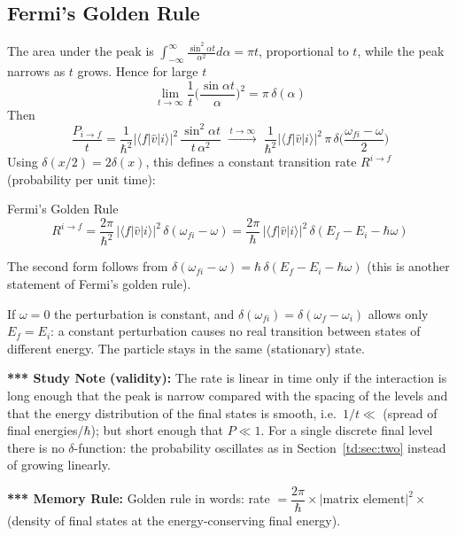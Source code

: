\documentclass[11pt,a4paper]{article}
\begin{document}
\subsection{Fermi's Golden Rule}
The area under the peak is $\int_{-\infty}^\infty\frac{\sin^2\alpha t}{\alpha^2}d\alpha=\pi t$, proportional to $t$, while the peak narrows as $t$ grows. Hence for large $t$
\[
\lim_{t\to\infty}\frac1t\Big(\frac{\sin\alpha t}{\alpha}\Big)^2=\pi\,\delta(\alpha)
\]
Then
\[
\frac{P_{i\to f}}{t}=\frac1{\hbar^2}|\langle f|\hat v|i\rangle|^2\,\frac{\sin^2\alpha t}{t\,\alpha^2}
\;\xrightarrow{\,t\to\infty\,}\;\frac1{\hbar^2}|\langle f|\hat v|i\rangle|^2\,\pi\,\delta\Big(\frac{\omega_{fi}-\omega}2\Big)
\]
Using $\delta(x/2)=2\delta(x)$, this defines a constant transition rate $R^{i\to f}$ (probability per unit time):
\begin{thm}{Fermi's Golden Rule}
\[
R^{i\to f}=\frac{2\pi}{\hbar^2}\,|\langle f|\hat v|i\rangle|^2\,\delta(\omega_{fi}-\omega)
=\frac{2\pi}\hbar\,|\langle f|\hat v|i\rangle|^2\,\delta(E_f-E_i-\hbar\omega)
\]
\end{thm}
The second form follows from $\delta(\omega_{fi}-\omega)=\hbar\,\delta(E_f-E_i-\hbar\omega)$ (this is another statement of Fermi's golden rule).

If $\omega=0$ the perturbation is constant, and $\delta(\omega_{fi})=\delta(\omega_f-\omega_i)$ allows only $E_f=E_i$: a constant perturbation causes no real transition between states of different energy. The particle stays in the same (stationary) state.

\textbf{*** Study Note (validity):} The rate is linear in time only if the interaction is long enough that the peak is narrow compared with the spacing of the levels and that the energy distribution of the final states is smooth, i.e.\ $1/t\ll$ (spread of final energies$/\hbar$); but short enough that $P\ll1$. For a single discrete final level there is no $\delta$-function: the probability oscillates as in Section~\ref{td:sec:two} instead of growing linearly.

\textbf{*** Memory Rule:} Golden rule in words: rate $=\dfrac{2\pi}\hbar\times|\text{matrix element}|^2\times$ (density of final states at the energy-conserving final energy).
\end{document}
